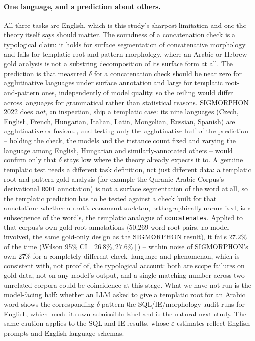 \documentclass[11pt]{article}
\begin{document}
\paragraph{One language, and a prediction about others.} All three tasks are
English, which is this study's sharpest limitation and one the theory itself says
should matter. The soundness of a concatenation check is a typological claim: it
holds for surface segmentation of concatenative morphology and fails for
templatic root-and-pattern morphology, where an Arabic or Hebrew gold analysis is
not a substring decomposition of its surface form at all. The prediction is that measured $\delta$ for a concatenation check should be near
zero for agglutinative languages under surface annotation and large for templatic
root-and-pattern ones, independently of model quality, so the ceiling would
differ across languages for grammatical rather than statistical reasons.
SIGMORPHON 2022 does \emph{not}, on inspection, ship a templatic case: its
nine languages (Czech, English, French, Hungarian, Italian, Latin,
Mongolian, Russian, Spanish) are agglutinative or fusional, and testing
only the agglutinative half of the prediction -- holding the check, the
models and the instance count fixed and varying the language among
English, Hungarian and similarly-annotated others -- would confirm only
that $\delta$ stays low where the theory already expects it to. A genuine
templatic test needs a different task definition, not just different
data: a templatic root-and-pattern gold analysis (for example the
Quranic Arabic Corpus's \citep{dukes2010morphological} derivational \texttt{ROOT} annotation) is not a
surface segmentation of the word at all, so the templatic prediction has
to be tested against a check built for that annotation: whether a
root's consonant skeleton, orthographically normalised, is a subsequence
of the word's, the templatic analogue of \texttt{concatenates}. Applied
to that corpus's own gold root annotations (50{,}269 word-root pairs,
no model involved, the same gold-only design as the SIGMORPHON result), it fails
$27.2\%$ of the time (Wilson 95\% CI $[26.8\%,27.6\%]$) -- within noise of
SIGMORPHON's own $27\%$ for a completely different check, language and
phenomenon, which is consistent with, not proof of, the typological
account: both are scope failures on gold data, not on any model's
output, and a single matching number across two unrelated corpora could
be coincidence at this stage. What we have not run is the model-facing
half: whether an LLM asked to give a templatic root for an Arabic word
shows the corresponding $\delta$ pattern the SQL/IE/morphology audit
runs for English, which needs its own admissible label and is the
natural next study. The same caution applies to the SQL and IE results, whose
$\varepsilon$ estimates reflect English prompts and English-language schemas.
\end{document}
